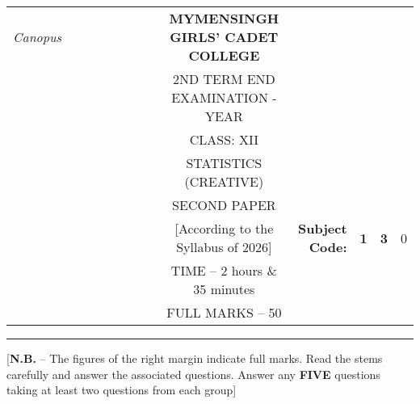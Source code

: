 \documentclass[12pt]{article}
\begin{document}
\begin{table}[]
\begin{tabular}{llllllllcllcl}
\textit{Canopus} &  &  &  &  &  &  &  & \textbf{MYMENSINGH GIRLS’ CADET COLLEGE} &                                             &                                 & \multicolumn{1}{l}{}            &                        \\
                 &  &  &  &  &  &  &  & 2ND TERM END EXAMINATION - YEAR          &                                             &                                 &                                 &                        \\
                 &  &  &  &  &  &  &  & CLASS: XII                               &                                             &                                 &                                 &                        \\
                 &  &  &  &  &  &  &  & STATISTICS (CREATIVE)                    &                                             &                                 &                                 &                        \\
                 &  &  &  &  &  &  &  & SECOND PAPER                             &                                             &                                 & \multicolumn{1}{r}{}            &                        \\ \cline{11-13} 
                 &  &  &  &  &  &  &  & [According to the Syllabus of 2026]      & \multicolumn{1}{r|}{\textbf{Subject Code:}} & \multicolumn{1}{l|}{\textbf{1}} & \multicolumn{1}{l|}{\textbf{3}} & \multicolumn{1}{l|}{0} \\ \cline{11-13} 
                 &  &  &  &  &  &  &  & TIME – 2 hours \& 35 minutes             &                                             &                                 & \multicolumn{1}{r}{}            &                        \\
                 &  &  &  &  &  &  &  & FULL MARKS – 50                          &                                             &                                 & \multicolumn{1}{r}{\textbf{}}   &                       
\end{tabular}
\end{table}


\hrule

\begin{center}
[\textbf{N.B.} – The figures of the right margin indicate full marks. Read the stems carefully and answer the associated questions. Answer any \textbf{FIVE} questions taking at least two questions from each group]\\
\end{center}
\end{document}
